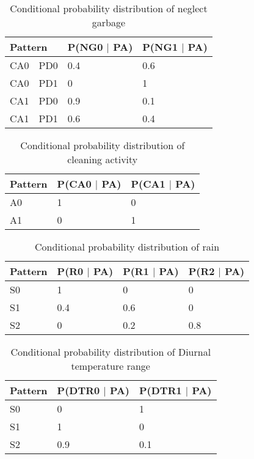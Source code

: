 \documentclass[a4paper,9pt,nil]{article}
\begin{document}
	\begin{table}[!htbp]
		\centering
		\normalsize
		\begin{tabular}{|l|l|l|l|}
			\hline
				\multicolumn{2}{|l|}{Pattern}  & P(NG0 $\mid$ PA) & P(NG1 $\mid$ PA)\\
			\hline
				CA0 & PD0 & 0.4 & 0.6\\
			\hline
				CA0 & PD1 & 0 & 1\\
			\hline
				CA1 & PD0 & 0.9 & 0.1\\
			\hline
				CA1 & PD1 & 0.6 & 0.4\\
			\hline
		\end{tabular}
		\caption{Conditional probability distribution of neglect garbage}
	\end{table}
	
	\begin{table}[!htbp]
		\centering
		\normalsize
		\begin{tabular}{|l|l|l|}
			\hline
				Pattern & P(CA0 $\mid$ PA) & P(CA1 $\mid$ PA)\\
			\hline
				A0 & 1 & 0\\
			\hline
				A1 & 0 & 1\\
			\hline
		\end{tabular}
		\caption{Conditional probability distribution of cleaning activity}
	\end{table}
	
	
	\begin{table}[!htbp]
		\centering
		\normalsize
		\begin{tabular}{|l|l|l|l|}
			\hline
				Pattern & P(R0 $\mid$ PA) & P(R1 $\mid$ PA) & P(R2 $\mid$ PA)\\
			\hline
				S0 & 1 & 0 & 0\\
			\hline
				S1 & 0.4 & 0.6 & 0\\
			\hline
				S2 & 0 & 0.2 & 0.8\\
			\hline
		\end{tabular}
		\caption{Conditional probability distribution of rain}
	\end{table}
	
	\begin{table}[!htbp]
		\centering
		\normalsize
		\begin{tabular}{|l|l|l|}
			\hline
				Pattern & P(DTR0 $\mid$  PA) & P(DTR1 $\mid$  PA)\\
			\hline
				S0 & 0 & 1\\
			\hline
				S1 & 1 & 0\\
			\hline
				S2 & 0.9 & 0.1\\
			\hline
		\end{tabular}
		\caption{Conditional probability distribution of Diurnal temperature range}
	\end{table}
	
\end{document}
